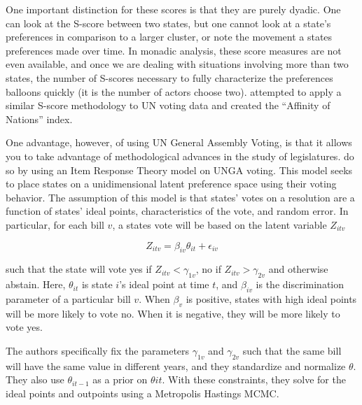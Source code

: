 One important distinction for these scores is that they are purely dyadic. One can look at the S-score between two states, but one cannot look at a state's preferences in comparison to a larger cluster, or note the movement a states preferences made over time. In monadic analysis, these score measures are not even available, and once we are dealing with situations involving more than two states, the number of S-scores necessary to fully characterize the preferences balloons quickly (it is the number of actors choose two). \citet{gartzke:1998} attempted to apply a similar S-score methodology to UN voting data and created the ``Affinity of Nations'' index.

One advantage, however, of using UN General Assembly Voting, is that it allows you to take advantage of methodological advances in the study of legislatures. \citet{bailey:strezhnev:voeten:2015} do so by using an Item Response Theory model on UNGA voting. This model seeks to place states on a unidimensional latent preference space using their voting behavior. The assumption of this model is that states' votes on a resolution are a function of states' ideal points, characteristics of the vote, and random error. In particular, for each bill $v$, a states vote will be based on the latent variable $Z_{itv}$

\begin{equation}
	Z_{itv} = \beta_{iv}\theta_{it} + \epsilon_{iv}
\end{equation}

such that the state will vote yes if $Z_{itv} < \gamma_{1v}$, no if $Z_{itv} > \gamma_{2v}$ and otherwise abstain. Here, $\theta_{it}$ is state $i$'s ideal point at time $t$, and $\beta_{iv}$ is the discrimination parameter of a particular bill $v$. When $\beta_{v}$ is positive, states with high ideal points will be more likely to vote no. When it is negative, they will be more likely to vote yes.

The authors specifically fix the parameters $\gamma_{1v}$ and $\gamma_{2v}$ such that the same bill will have the same value in different years, and they standardize and normalize $\theta$. They also use $\theta_{it-1}$ as a prior on $\theta{it}$. With these constraints, they solve for the ideal points and outpoints using a Metropolis Hastings MCMC.

